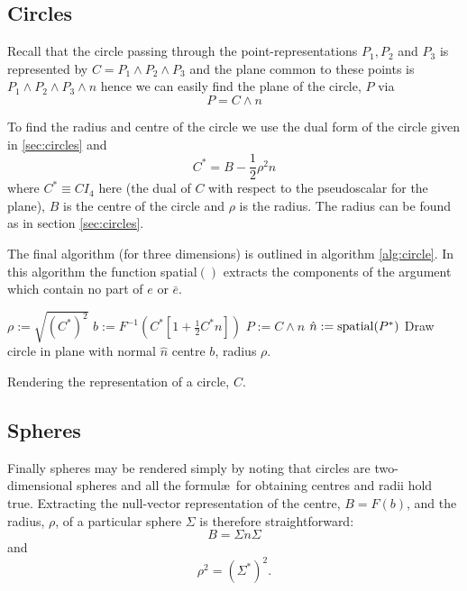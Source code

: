 \subsection{Circles}

Recall that the circle passing through the point-representations $P_1, P_2$ and $P_3$
is represented by $C = P_1 \wedge P_2 \wedge P_3$ and the plane common to these points is
$P_1 \wedge P_2 \wedge P_3 \wedge n$ hence we can easily find the plane of 
the circle, $P$ via
\[
P = C \wedge n
\]

To find the radius and centre of the circle we use the dual form of the 
circle given in \ref{sec:circles} and \cite{wareham_lasenby}
\[
C^* = B - \frac{1}{2}\rho^2n
\]
where $C^* \equiv CI_4$ here (the dual of $C$ with respect to the pseudoscalar 
for the plane), $B$ is the centre of the circle and $\rho$ is the radius. The
radius can be found as in section \ref{sec:circles}.
 
The final algorithm (for three dimensions) is outlined in algorithm \ref{alg:circle}.
In this algorithm the function spatial$()$ extracts the components of the argument
which contain no part of $e$ or $\bar{e}$.

\begin{fancyalg}
\begin{algorithmic}[1]
\STATE $\rho := \sqrt{(C^*)^2}$
\STATE $b := F^{-1}\left(C^* \left[ 1 + \frac{1}{2}C^*n \right]\right)$
\STATE $P := C \wedge n$
\STATE $\hat{n} := {\rm spatial}(P^*)$
\STATE Draw circle in plane with normal $\hat{n}$ centre
$b$, radius $\rho$.
\end{algorithmic}
\caption{\label{alg:circle}Rendering the representation of a circle, $C$.}
\end{fancyalg}

\subsection{Spheres}

Finally spheres may be rendered simply by noting that circles are two-dimensional
spheres and all the formul\ae\ for obtaining centres and radii hold true. Extracting
the null-vector representation of the centre, $B = F(b)$, and the radius, $\rho$,
of a particular sphere $\Sigma$ is therefore straightforward:
\[
B = \Sigma n \Sigma
\]
and
\[
\rho^2 = \left(\Sigma^*\right)^2.
\]
